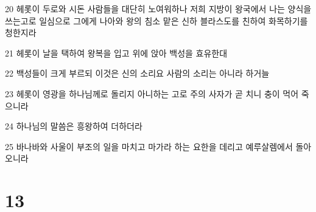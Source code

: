 \par 20 헤롯이 두로와 시돈 사람들을 대단히 노여워하나 저희 지방이 왕국에서 나는 양식을 쓰는고로 일심으로 그에게 나아와 왕의 침소 맡은 신하 블라스도를 친하여 화목하기를 청한지라
\par 21 헤롯이 날을 택하여 왕복을 입고 위에 앉아 백성을 효유한대
\par 22 백성들이 크게 부르되 이것은 신의 소리요 사람의 소리는 아니라 하거늘
\par 23 헤롯이 영광을 하나님께로 돌리지 아니하는 고로 주의 사자가 곧 치니 충이 먹어 죽으니라
\par 24 하나님의 말씀은 흥왕하여 더하더라
\par 25 바나바와 사울이 부조의 일을 마치고 마가라 하는 요한을 데리고 예루살렘에서 돌아오니라

\chapter{13}

